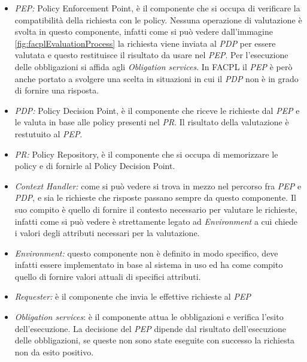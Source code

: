 \begin{itemize}
    \item \emph{PEP:} Policy Enforcement Point, è il componente che si occupa di verificare la compatibilità della richiesta con le policy. Nessuna operazione di valutazione è svolta in questo componente, infatti come si può vedere dall'immagine \ref{fig:facplEvaluationProcess} la richiesta viene inviata al \emph{PDP} per essere valutata e questo restituisce il risultato da usare nel \emph{PEP}. Per l'esecuzione delle obbligazioni si affida agli \emph{Obligation services}. In FACPL il \emph{PEP} è però anche portato a svolgere una scelta in situazioni in cui il \emph{PDP} non è in grado di fornire una risposta.
    \item \emph{PDP:} Policy Decision Point, è il componente che riceve le richieste dal \emph{PEP} e le valuta in base alle policy presenti nel \emph{PR}. Il risultato della valutazione è restutuito al \emph{PEP}.
    \item \emph{PR:} Policy Repository, è il componente che si occupa di memorizzare le policy e di fornirle al Policy Decision Point.
    \item \emph{Context Handler:} come si può vedere si trova in mezzo nel percorso fra \emph{PEP} e \emph{PDP}, e sia le richieste che risposte passano sempre da questo componente. Il suo compito è quello di fornire il contesto necessario per valutare le richieste, infatti come si può vedere è strettamente legato ad \emph{Environment} a cui chiede i valori degli attributi necessari per la valutazione.
    \item \emph{Environment:} questo componente non è definito in modo specifico, deve infatti essere implementato in base al sistema in uso ed ha come compito quello di fornire valori attuali di specifici attributi.
    \item \emph{Requester:} è il componente che invia le effettive richieste al \emph{PEP}
    \item \emph{Obligation services}: è il componente attua le obbligazioni e verifica l'esito dell'esecuzione. La decisione del \emph{PEP} dipende dal risultato dell'esecuzione delle obbligazioni, se queste non sono state eseguite con successo la richiesta non da esito positivo.
\end{itemize}
